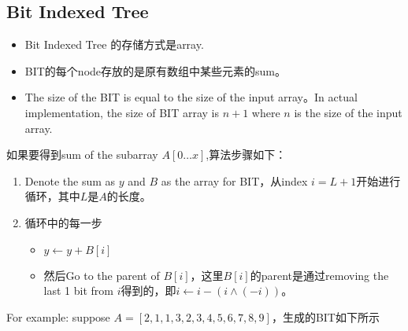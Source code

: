 \subsection{Bit Indexed Tree}
\begin{itemize}
\item Bit Indexed Tree 的存储方式是array.
\item BIT的每个node存放的是原有数组中某些元素的sum。
\item The size of the BIT is equal to the size of the input array。In actual implementation, the size of BIT array is $n+1$ where $n$ is the size of the input array.
\end{itemize}
如果要得到sum of the subarray $A[0\ldots x]$,算法步骤如下：
\begin{enumerate}
\item Denote the sum as $y$ and $B$ as the array for BIT，从index $i = L+1$开始进行循环，其中$L$是$ A $的长度。
\item 循环中的每一步
\begin{itemize}
\item $y\gets y+B[i]$
\item 然后Go to the parent of $B[i]$，这里$ B[i] $的parent是通过removing the last 1 bit from $ i $得到的，即$i\gets i - (i\land(-i))$。
\end{itemize}
\end{enumerate}
For example: suppose $A = [2, 1, 1, 3, 2, 3, 4, 5, 6, 7, 8, 9]$，生成的BIT如下所示
